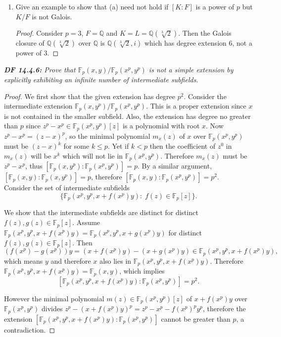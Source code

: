 \documentclass{article}
\begin{document}
\begin{enumerate}[label={(\alph*)}]
    \item Give an example to show that (a) need not hold if $[K:F]$ is a
      power of $p$ but $K/F$ is not Galois.

      \begin{proof}
        Consider $p=3$, $F=\mathbb{Q}$ and $K=L=\mathbb{Q}(\sqrt[3]{2})$.
        Then the Galois closure of $\mathbb{Q}(\sqrt[3]{2})$ over
        $\mathbb{Q}$ is $\mathbb{Q}(\sqrt[3]{2},i)$ which has degree
        extension 6, not a power of 3.
      \end{proof}
  \end{enumerate}

\it \textbf{DF 14.4.6:} Prove that
  $\mathbb{F}_p(x,y)/\mathbb{F}_p(x^p,y^p)$ is not a simple extension by
  explicitly exhibiting an infinite number of intermediate subfields.

  \begin{proof}
    We first show that the given extension has degree $p^2$. Consider the
    intermediate extension $\mathbb{F}_p(x,y^p)/\mathbb{F}_p(x^p,y^p)$.
    This is a proper extension since $x$ is not contained in the smaller
    subfield. Also, the extension has degree no greater than $p$ since
    $z^p-x^p\in \mathbb{F}_p(x^p,y^p)[z]$ is a polynomial with root $x$.
    Now $z^p-x^p=(z-x)^p$, so the minimal polynomial $m_x(z)$ of $x$ over
    $\mathbb{F}_p(x^p,y^p)$ must be $(z-x)^k$ for some $k\leq p$. Yet if
    $k<p$ then the coefficient of $z^0$ in $m_x(z)$ will be $x^k$ which
    will not lie in $\mathbb{F}_p(x^p,y^p)$. Therefore $m_x(z)$ must be
    $z^p-x^p$, thus $[\mathbb{F}_p(x,y^p):\mathbb{F}_p(x^p,y^p)]=p$. By a
    similar argument, $[\mathbb{F}_p(x,y):\mathbb{F}_p(x,y^p)]=p$,
    therefore $[\mathbb{F}_p(x,y):\mathbb{F}_p(x^p,y^p)]=p^2$. \\

    Consider the set of intermediate subfields
    \[\{\mathbb{F}_p(x^p,y^p,x+f(x^p)y):\; f(z)\in\mathbb{F}_p[z]\}.\]

    We show that the intermediate subfields are distinct for distinct
    $f(z),g(z)\in\mathbb{F}_p[z]$. Assume $\mathbb{F}_p(x^p,y^p,x+f(x^p)y)
    =\mathbb{F}_p(x^p,y^p,x+g(x^p)y)$ for distinct
    $f(z),g(z)\in\mathbb{F}_p[z]$. Then
    \[(f(x^p)-g(x^p))y =(x+f(x^p)y) -(x+g(x^p)y)
    \in\mathbb{F}_p(x^p,y^p,x+f(x^p)y),\]
    which means $y$ and therefore $x$ also lies in
    $\mathbb{F}_p(x^p,y^p,x+f(x^p)y)$. Therefore
    $\mathbb{F}_p(x^p,y^p,x+f(x^p)y) =\mathbb{F}_p(x,y)$, which implies
    \[[\mathbb{F}_p(x^p,y^p,x+f(x^p)y): \mathbb{F}_p(x^p,y^p)] =p^2.\]

    However the minimal polynomial $m(z)\in \mathbb{F}_p(x^p,y^p)[z]$ of
    $x+f(x^p)y$ over $\mathbb{F}_p(x^p,y^p)$ divides $z^p-(x+f(x^p)y)^p
    =z^p-x^p-f(x^p)^py^p$, therefore the extension
    $[\mathbb{F}_p(x^p,y^p,x+f(x^p)y): \mathbb{F}_p(x^p,y^p)]$ cannot be
    greater than $p$, a contradiction.
  \end{proof}
\end{document}

